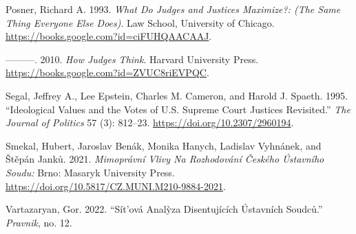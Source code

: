 \documentclass[
  11pt,
]{article}
\newlength{\cslhangindent}
\newenvironment{CSLReferences}[2] %
 {%
  \setlength{\parindent}{0pt}
  \ifodd #1 \everypar{\setlength{\hangindent}{\cslhangindent}}\ignorespaces\fi
  \ifnum #2 > 0
  \setlength{\parskip}{#2\baselineskip}
  \fi
 }%
 {}
\begin{document}
\begin{CSLReferences}{1}{0}
\leavevmode{}%
Posner, Richard A. 1993. \emph{What {Do Judges} and {Justices
Maximize}?: (The {Same Thing Everyone Else Does})}. {Law School,
University of Chicago}. \url{https://books.google.com?id=ciFUHQAACAAJ}.

\leavevmode{}%
---------. 2010. \emph{How {Judges Think}}. {Harvard University Press}.
\url{https://books.google.com?id=ZVUC8riEVPQC}.

\leavevmode{}%
Segal, Jeffrey A., Lee Epstein, Charles M. Cameron, and Harold J.
Spaeth. 1995. {``Ideological {Values} and the {Votes} of {U}.{S}.
{Supreme Court Justices Revisited}.''} \emph{The Journal of Politics} 57
(3): 812--23. \url{https://doi.org/10.2307/2960194}.

\leavevmode{}%
Smekal, Hubert, Jaroslav Benák, Monika Hanych, Ladislav Vyhnánek, and
Štěpán Janků. 2021. \emph{Mimoprávní Vlivy Na Rozhodování Českého
{Ústavního} Soudu:} {Brno}: {Masaryk University Press}.
\url{https://doi.org/10.5817/CZ.MUNI.M210-9884-2021}.

\leavevmode{}%
Vartazaryan, Gor. 2022. {``Sít'ová Analỳza Disentujících Ústavních
Soudců.''} \emph{Pravnik}, no. 12.

\end{CSLReferences}
\end{document}

